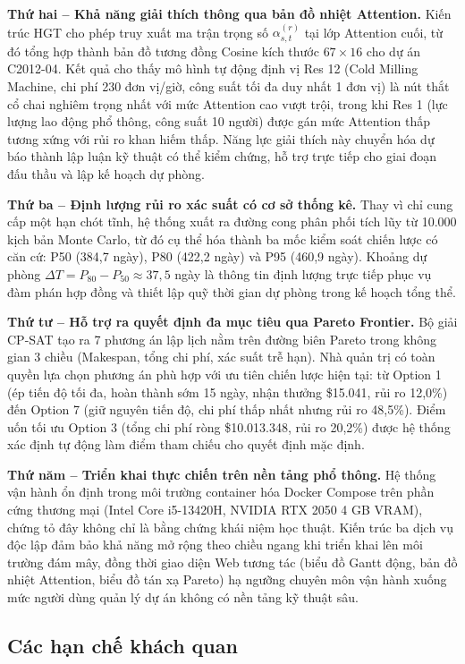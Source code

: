 \textbf{Thứ hai -- Khả năng giải thích thông qua bản đồ nhiệt Attention.}
Kiến trúc HGT cho phép truy xuất ma trận trọng số $\alpha_{s,t}^{(r)}$ tại lớp Attention cuối, từ đó tổng hợp thành bản đồ tương đồng Cosine kích thước $67 \times 16$ cho dự án C2012-04. Kết quả cho thấy mô hình tự động định vị Res 12 (Cold Milling Machine, chi phí 230 đơn vị/giờ, công suất tối đa duy nhất 1 đơn vị) là nút thắt cổ chai nghiêm trọng nhất với mức Attention cao vượt trội, trong khi Res 1 (lực lượng lao động phổ thông, công suất 10 người) được gán mức Attention thấp tương xứng với rủi ro khan hiếm thấp. Năng lực giải thích này chuyển hóa dự báo thành lập luận kỹ thuật có thể kiểm chứng, hỗ trợ trực tiếp cho giai đoạn đấu thầu và lập kế hoạch dự phòng.

\textbf{Thứ ba -- Định lượng rủi ro xác suất có cơ sở thống kê.}
Thay vì chỉ cung cấp một hạn chót tĩnh, hệ thống xuất ra đường cong phân phối tích lũy từ 10.000 kịch bản Monte Carlo, từ đó cụ thể hóa thành ba mốc kiểm soát chiến lược có căn cứ: P50 (384,7 ngày), P80 (422,2 ngày) và P95 (460,9 ngày). Khoảng dự phòng $\Delta T = P_{80} - P_{50} \approx 37{,}5$ ngày là thông tin định lượng trực tiếp phục vụ đàm phán hợp đồng và thiết lập quỹ thời gian dự phòng trong kế hoạch tổng thể.

\textbf{Thứ tư -- Hỗ trợ ra quyết định đa mục tiêu qua Pareto Frontier.}
Bộ giải CP-SAT tạo ra 7 phương án lập lịch nằm trên đường biên Pareto trong không gian 3 chiều (Makespan, tổng chi phí, xác suất trễ hạn). Nhà quản trị có toàn quyền lựa chọn phương án phù hợp với ưu tiên chiến lược hiện tại: từ Option 1 (ép tiến độ tối đa, hoàn thành sớm 15 ngày, nhận thưởng \$15.041, rủi ro 12,0\%) đến Option 7 (giữ nguyên tiến độ, chi phí thấp nhất nhưng rủi ro 48,5\%). Điểm uốn tối ưu Option 3 (tổng chi phí ròng \$10.013.348, rủi ro 20,2\%) được hệ thống xác định tự động làm điểm tham chiếu cho quyết định mặc định.

\textbf{Thứ năm -- Triển khai thực chiến trên nền tảng phổ thông.}
Hệ thống vận hành ổn định trong môi trường container hóa Docker Compose trên phần cứng thương mại (Intel Core i5-13420H, NVIDIA RTX 2050 4 GB VRAM), chứng tỏ đây không chỉ là bằng chứng khái niệm học thuật. Kiến trúc ba dịch vụ độc lập đảm bảo khả năng mở rộng theo chiều ngang khi triển khai lên môi trường đám mây, đồng thời giao diện Web tương tác (biểu đồ Gantt động, bản đồ nhiệt Attention, biểu đồ tán xạ Pareto) hạ ngưỡng chuyên môn vận hành xuống mức người dùng quản lý dự án không có nền tảng kỹ thuật sâu.

\subsection{Các hạn chế khách quan}
\label{sec:4.2.2_han_che}

